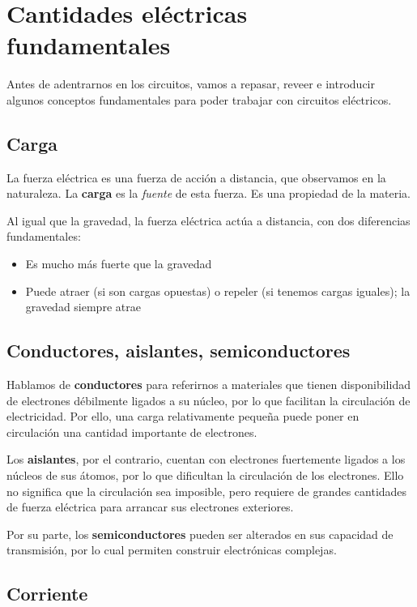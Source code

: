 
\section{Cantidades eléctricas fundamentales}

Antes de adentrarnos en los circuitos,
vamos a repasar,
reveer e introducir algunos conceptos fundamentales para poder trabajar con circuitos eléctricos.

\subsection{Carga}

La fuerza eléctrica es una fuerza de acción a distancia,
que observamos en la naturaleza. 
La \textbf{carga} es la \textit{fuente} de esta fuerza.
Es una propiedad de la materia.

Al igual que la gravedad,
la fuerza eléctrica actúa a distancia,
con dos diferencias fundamentales:
\begin{itemize}
    \item Es mucho más fuerte que la gravedad 
    \item Puede atraer (si son cargas opuestas) o repeler (si tenemos cargas iguales); la gravedad siempre atrae
\end{itemize}

\subsection{Conductores, aislantes, semiconductores}

Hablamos de \textbf{conductores} para referirnos a materiales que tienen disponibilidad de electrones débilmente ligados a su núcleo,
por lo que facilitan la circulación de electricidad.
Por ello, una carga relativamente pequeña puede poner en circulación una cantidad importante de electrones.

Los \textbf{aislantes}, por el contrario, 
cuentan con electrones fuertemente ligados a los núcleos de sus átomos,
por lo que dificultan la circulación de los electrones.
Ello no significa que la circulación sea imposible,
pero requiere de grandes cantidades de fuerza eléctrica para arrancar sus electrones exteriores.

Por su parte, los \textbf{semiconductores} pueden ser alterados en sus capacidad de transmisión,
por lo cual permiten construir electrónicas complejas.

\subsection{Corriente}

